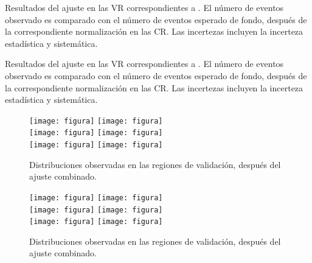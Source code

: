 \begin{table}[!htbp]

  \caption{Resultados del ajuste en las VR correspondientes a {\SRH}.
    El número de eventos observado es comparado con el número de eventos esperado de fondo, después de la correspondiente
    normalización en las CR. Las incertezas incluyen la incerteza estadística y sistemática.}
  \label{tab:fit_result_vrh1}

  

\end{table}


\begin{table}[!htbp]

  \caption{Resultados del ajuste en las VR correspondientes a {\SRH}.
    El número de eventos observado es comparado con el número de eventos esperado de fondo, después de la correspondiente
    normalización en las CR. Las incertezas incluyen la incerteza estadística y sistemática.}
  \label{tab:fit_result_vrh2}

  

\end{table}


\begin{figure}[!htbp]
  \centering

  \texttt{[image: figura]}
  \texttt{[image: figura]} \\

  \texttt{[image: figura]}
  \texttt{[image: figura]} \\

  \texttt{[image: figura]}
  \texttt{[image: figura]} \\

  \caption{Distribuciones observadas en las regiones de validación, después del ajuste combinado.}
  \label{fig:bkgfit_vrl}

\end{figure}


\begin{figure}[!htbp]
  \centering

  \texttt{[image: figura]}
  \texttt{[image: figura]} \\

  \texttt{[image: figura]}
  \texttt{[image: figura]} \\

  \texttt{[image: figura]}
  \texttt{[image: figura]} \\

  \caption{Distribuciones observadas en las regiones de validación,  después del ajuste combinado.}
  \label{fig:bkgfit_vrh}

\end{figure}

